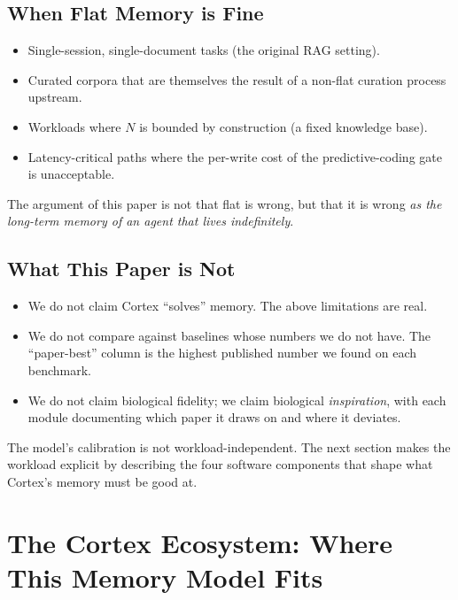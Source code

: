 \documentclass[11pt]{article}
\begin{document}
\subsection{When Flat Memory is Fine}
\label{sec:when-flat}

\begin{itemize}
  \item Single-session, single-document tasks (the original RAG
        setting).
  \item Curated corpora that are themselves the result of a
        non-flat curation process upstream.
  \item Workloads where $N$ is bounded by construction (a fixed
        knowledge base).
  \item Latency-critical paths where the per-write cost of the
        predictive-coding gate is unacceptable.
\end{itemize}

The argument of this paper is not that flat is wrong, but that it
is wrong \emph{as the long-term memory of an agent that lives
indefinitely}.

\subsection{What This Paper is Not}
\label{sec:not}

\begin{itemize}
  \item We do not claim Cortex ``solves'' memory.  The above
        limitations are real.
  \item We do not compare against baselines whose numbers we do
        not have.  The ``paper-best'' column is the highest
        published number we found on each benchmark.
  \item We do not claim biological fidelity; we claim biological
        \emph{inspiration}, with each module documenting which
        paper it draws on and where it deviates.
\end{itemize}

The model's calibration is not workload-independent.  The next
section makes the workload explicit by describing the four
software components that shape what Cortex's memory must be good
at.

\section{The Cortex Ecosystem: Where This Memory Model Fits}
\label{sec:ecosystem}
\end{document}
